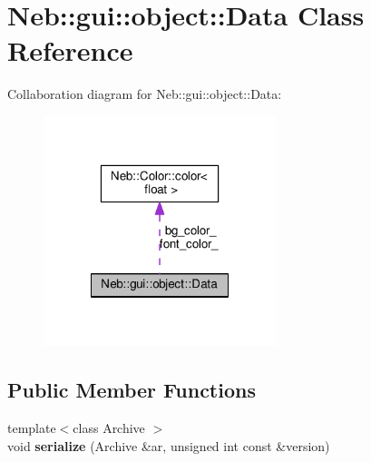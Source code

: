 \hypertarget{classNeb_1_1gui_1_1object_1_1Data}{\section{Neb\-:\-:gui\-:\-:object\-:\-:Data Class Reference}
\label{classNeb_1_1gui_1_1object_1_1Data}
}


Collaboration diagram for Neb\-:\-:gui\-:\-:object\-:\-:Data\-:
\nopagebreak
\begin{figure}[H]
\begin{center}
\leavevmode
\includegraphics[width=192pt]{classNeb_1_1gui_1_1object_1_1Data__coll__graph}
\end{center}
\end{figure}
\subsection*{Public Member Functions}
\begin{DoxyCompactItemize}
\item 
\hypertarget{classNeb_1_1gui_1_1object_1_1Data_acb81238a3d1971c883a1136c4ac53bc0}{{\footnotesize template$<$class Archive $>$ }\\void {\bfseries serialize} (Archive \&ar, unsigned int const \&version)}\label{classNeb_1_1gui_1_1object_1_1Data_acb81238a3d1971c883a1136c4ac53bc0}

\end{DoxyCompactItemize}
